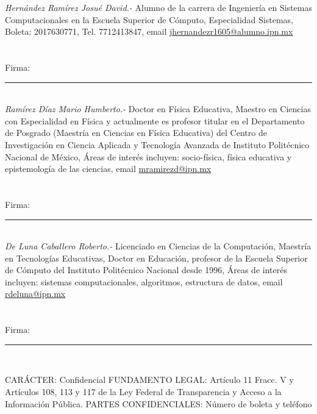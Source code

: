 \documentclass[letterpaper, 10pt]{article}
\def\letra#1#2{%
\tamanyo=#1%
\interlinea=1.2\tamanyo%
\fontfamily{ptm}
\fontsize{\the\tamanyo}%
{\the\interlinea}\selectfont#2}
\begin{document}
\begin{multicols*}{2}
    \textit{Hernández Ramírez Josué David.- }Alumno de la carrera de Ingeniería en Sistemas Computacionales en la Escuela Superior de Cómputo, Especialidad Sistemas, Boleta: 2017630771, Tel. 7712413847, email \url{jhernandezr1605@alumno.ipn.mx}\\\\
    \vspace{5mm} %
    \\
    Firma: \rule{7cm}{1pt}
    \vspace{5mm} %
    \\
    \textit{Ramírez Díaz Mario Humberto.- }Doctor en Física Educativa, Maestro en Ciencias con Especialidad en Física y actualmente es profesor titular en el Departamento de Posgrado (Maestría en Ciencias en Física Educativa) del Centro de Investigación en Ciencia Aplicada y Tecnología Avanzada de Instituto Politécnico Nacional de México, Áreas de interés incluyen: socio-física, física educativa y epistemología de las ciencias, email \url{mramirezd@ipn.mx} \\ \\
    \vspace{5mm} %
    \\
    Firma: \rule{7cm}{1pt}
    \vspace{5mm} %
    \\
    \textit{De Luna Caballero Roberto.- }Licenciado en Ciencias de la Computación, Maestría en Tecnologías Educativas, Doctor en Educación, profesor de la Escuela Superior de Cómputo del Instituto Politécnico Nacional desde 1996, Áreas de interés incluyen: sistemas computacionales, algoritmos, estructura de datos, email \url{rdeluna@ipn.mx} \\ \\
    \vspace{5mm} %
    \\
    Firma: \rule{7cm}{1pt}
    \vspace{5mm} %
    \\
    \begin{tcolorbox}[colback=black!5!white,colframe=black!5!white,]
        \begin{flushright}
        \letra{8pt}{
            CARÁCTER: Confidencial
            \newline
            FUNDAMENTO LEGAL: Artículo 11 Fracc. V y Artículos
            108, 113 y 117 de la Ley Federal de Transparencia y Acceso
            a la Información Pública.
            \newline
            PARTES CONFIDENCIALES: Número de boleta y teléfono
        }
            
        \end{flushright}
   
    \end{tcolorbox}
    
\end{multicols*}
\end{document}
